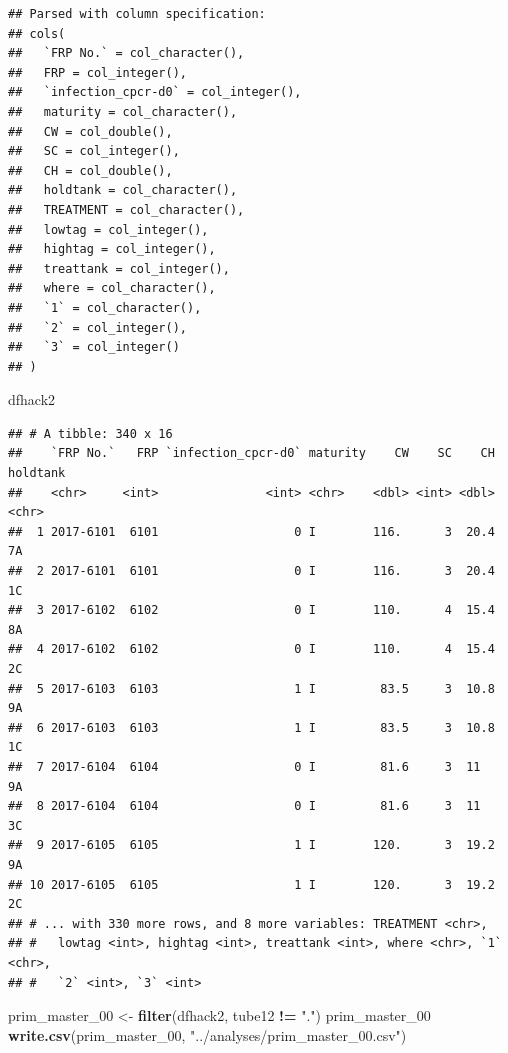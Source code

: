\documentclass[]{article}
\newenvironment{Shaded}{\begin{snugshade}}{\end{snugshade}}
\newcommand{\KeywordTok}[1]{\textcolor[rgb]{0.13,0.29,0.53}{\textbf{#1}}}
\newcommand{\DecValTok}[1]{\textcolor[rgb]{0.00,0.00,0.81}{#1}}
\newcommand{\StringTok}[1]{\textcolor[rgb]{0.31,0.60,0.02}{#1}}
\newcommand{\OperatorTok}[1]{\textcolor[rgb]{0.81,0.36,0.00}{\textbf{#1}}}
\newcommand{\NormalTok}[1]{#1}
\begin{document}
\begin{verbatim}
## Parsed with column specification:
## cols(
##   `FRP No.` = col_character(),
##   FRP = col_integer(),
##   `infection_cpcr-d0` = col_integer(),
##   maturity = col_character(),
##   CW = col_double(),
##   SC = col_integer(),
##   CH = col_double(),
##   holdtank = col_character(),
##   TREATMENT = col_character(),
##   lowtag = col_integer(),
##   hightag = col_integer(),
##   treattank = col_integer(),
##   where = col_character(),
##   `1` = col_character(),
##   `2` = col_integer(),
##   `3` = col_integer()
## )
\end{verbatim}

\begin{Shaded}
\begin{Highlighting}[]
\NormalTok{dfhack2}
\end{Highlighting}
\end{Shaded}

\begin{verbatim}
## # A tibble: 340 x 16
##    `FRP No.`   FRP `infection_cpcr-d0` maturity    CW    SC    CH holdtank
##    <chr>     <int>               <int> <chr>    <dbl> <int> <dbl> <chr>   
##  1 2017-6101  6101                   0 I        116.      3  20.4 7A      
##  2 2017-6101  6101                   0 I        116.      3  20.4 1C      
##  3 2017-6102  6102                   0 I        110.      4  15.4 8A      
##  4 2017-6102  6102                   0 I        110.      4  15.4 2C      
##  5 2017-6103  6103                   1 I         83.5     3  10.8 9A      
##  6 2017-6103  6103                   1 I         83.5     3  10.8 1C      
##  7 2017-6104  6104                   0 I         81.6     3  11   9A      
##  8 2017-6104  6104                   0 I         81.6     3  11   3C      
##  9 2017-6105  6105                   1 I        120.      3  19.2 9A      
## 10 2017-6105  6105                   1 I        120.      3  19.2 2C      
## # ... with 330 more rows, and 8 more variables: TREATMENT <chr>,
## #   lowtag <int>, hightag <int>, treattank <int>, where <chr>, `1` <chr>,
## #   `2` <int>, `3` <int>
\end{verbatim}

\begin{Shaded}
\begin{Highlighting}[]
\NormalTok{prim_master_}\DecValTok{00}\NormalTok{ <-}\StringTok{ }\KeywordTok{filter}\NormalTok{(dfhack2, tube12 }\OperatorTok{!=}\StringTok{ "."}\NormalTok{)}
\NormalTok{prim_master_}\DecValTok{00}
\KeywordTok{write.csv}\NormalTok{(prim_master_}\DecValTok{00}\NormalTok{, }\StringTok{"../analyses/prim_master_00.csv"}\NormalTok{)}
\end{Highlighting}
\end{Shaded}
\end{document}
